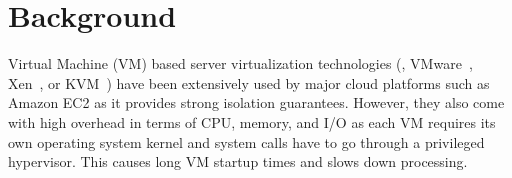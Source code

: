 \section{Background}
\label{sec:background}



Virtual Machine (VM) based server virtualization technologies (\eg, VMware~\cite{vmware},
Xen~\cite{xen}, or KVM~\cite{kvm}) have been extensively used by major cloud
platforms such as Amazon EC2 as it provides strong isolation guarantees.
%
%
However, they also come with high overhead in terms of CPU, memory, and I/O as
each VM requires its own operating system kernel and system calls have to go
through a privileged hypervisor. This causes long VM startup times and slows down
processing.
%
%

